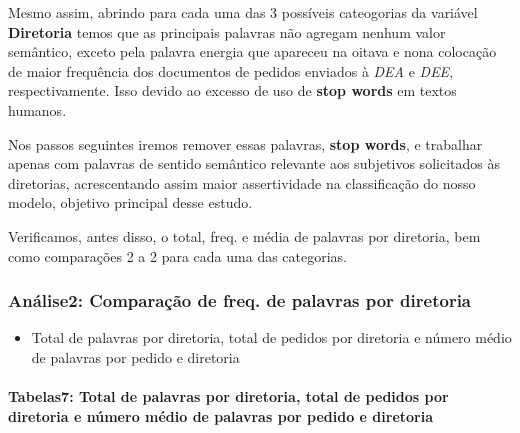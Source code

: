\documentclass[]{article}
\newenvironment{Shaded}{\begin{snugshade}}{\end{snugshade}}
\newcommand{\KeywordTok}[1]{\textcolor[rgb]{0.13,0.29,0.53}{\textbf{#1}}}
\newcommand{\DataTypeTok}[1]{\textcolor[rgb]{0.13,0.29,0.53}{#1}}
\newcommand{\StringTok}[1]{\textcolor[rgb]{0.31,0.60,0.02}{#1}}
\newcommand{\OperatorTok}[1]{\textcolor[rgb]{0.81,0.36,0.00}{\textbf{#1}}}
\newcommand{\NormalTok}[1]{#1}
\providecommand{\tightlist}{%
  \setlength{\itemsep}{0pt}\setlength{\parskip}{0pt}}
\let\oldparagraph\paragraph
\renewcommand{\paragraph}[1]{\oldparagraph{#1}\mbox{}}
\begin{document}
Mesmo assim, abrindo para cada uma das 3 possíveis cateogorias da
variável \textbf{Diretoria} temos que as principais palavras não agregam
nenhum valor semântico, exceto pela palavra energia que apareceu na
oitava e nona colocação de maior frequência dos documentos de pedidos
enviados à \emph{DEA} e \emph{DEE}, respectivamente. Isso devido ao
excesso de uso de \textbf{stop words} em textos humanos.

Nos passos seguintes iremos remover essas palavras, \textbf{stop words},
e trabalhar apenas com palavras de sentido semântico relevante aos
subjetivos solicitados às diretorias, acrescentando assim maior
assertividade na classificação do nosso modelo, objetivo principal desse
estudo.

Verificamos, antes disso, o total, freq. e média de palavras por
diretoria, bem como comparações 2 a 2 para cada uma das categorias.

\subsubsection{Análise2: Comparação de freq. de palavras por
diretoria}\label{analise2-comparacao-de-freq.-de-palavras-por-diretoria}

\begin{itemize}
\tightlist
\item
  Total de palavras por diretoria, total de pedidos por diretoria e
  número médio de palavras por pedido e diretoria
\end{itemize}

\begin{Shaded}
\end{Shaded}

\paragraph{Tabelas7: Total de palavras por diretoria, total de pedidos
por diretoria e número médio de palavras por pedido e
diretoria}\label{tabelas7-total-de-palavras-por-diretoria-total-de-pedidos-por-diretoria-e-numero-medio-de-palavras-por-pedido-e-diretoria}
\end{document}

